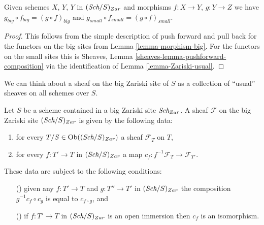 \begin{lemma}
\label{lemma-composition}
Given schemes $X$, $Y$, $Y$ in $(\textit{Sch}/S)_{Zar}$
and morphisms $f : X \to Y$, $g : Y \to Z$ we have
$g_{big} \circ f_{big} = (g \circ f)_{big}$ and
$g_{small} \circ f_{small} = (g \circ f)_{small}$.
\end{lemma}

\begin{proof}
This follows from the simple description of push forward
and pull back for the functors on the big sites from
Lemma \ref{lemma-morphism-big}. For the functors
on the small sites this is
Sheaves, Lemma \ref{sheaves-lemma-pushforward-composition}
via the identification of Lemma \ref{lemma-Zariski-usual}.
\end{proof}

\noindent
We can think about a sheaf on the big Zariski site of $S$ as a collection
of ``usual'' sheaves on all schemes over $S$.

\begin{lemma}
\label{lemma-characterize-sheaf-big}
Let $S$ be a scheme contained in a big Zariski site $\textit{Sch}_{Zar}$.
A sheaf $\mathcal{F}$ on the big Zariski site $(\textit{Sch}/S)_{Zar}$
is given by the following data:
\begin{enumerate}
\item for every $T/S \in \mathop{\rm Ob}\nolimits((\textit{Sch}/S)_{Zar})$ a sheaf
$\mathcal{F}_T$ on $T$,
\item for every $f : T' \to T$ in
$(\textit{Sch}/S)_{Zar}$ a map
$c_f : f^{-1}\mathcal{F}_T \to \mathcal{F}_{T'}$.
\end{enumerate}
These data are subject to the following conditions:
\begin{enumerate}
\item[(\romannumeral1)] given any $f : T' \to T$ and $g : T'' \to T'$ in
$(\textit{Sch}/S)_{Zar}$ the composition $g^{-1}c_f \circ c_g$
is equal to $c_{f \circ g}$, and
\item[(\romannumeral2)] if $f : T' \to T$ in $(\textit{Sch}/S)_{Zar}$ is an
open immersion then $c_f$ is an isomorphism.
\end{enumerate}
\end{lemma}

